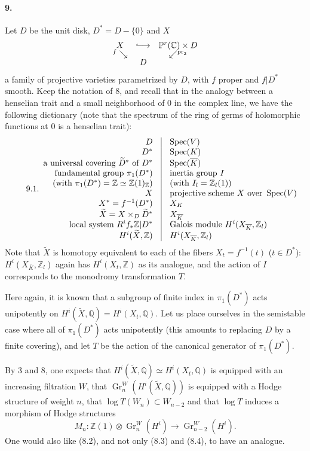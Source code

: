 \documentclass[10pt]{article}
\newcommand{\C}{\mathbb C}
\newcommand{\Q}{\mathbb Q}
\newcommand{\Z}{\mathbb Z}
\newcommand{\Gr}{\operatorname{Gr}}
\newcommand{\Spec}{\operatorname{Spec}}
\newcommand{\pr}{\operatorname{pr}}
\newcommand{\barK}{\overline{K}}
\newcommand{\wt}{\widetilde}
\begin{document}
\paragraph{9.} Let $D$ be the unit disk, $D^*=D-\{0\}$ and $X$
\[
\begin{array}{ccc}
X&\lhook\joinrel\longrightarrow&\mathbb P^r(\C)\times D\\[-0.2em]
{}^{f}\searrow&&\swarrow^{\pr_2}\\[-0.2em]
& D&
\end{array}
\]
a family of projective varieties parametrized by $D$, with $f$ proper and $f|D^*$ smooth. Keep the notation of 8, and recall that in the analogy between a henselian trait and a small neighborhood of $0$ in the complex line, we have the following dictionary (note that the spectrum of the ring of germs of holomorphic functions at $0$ is a henselian trait):
\[
\tag*{9.1.}
\begin{array}{r@{\quad\vrule\quad}l}
D & \Spec(V)\\
D^* & \Spec(K)\\
\text{a universal covering }\wt D^*\text{ of }D^* & \Spec(\barK)\\
\text{fundamental group }\pi_1(D^*) & \text{inertia group }I\\
\text{(with }\pi_1(D^*)=\Z\simeq\Z(1)_\Z\text{)} & \text{(with }I_l=\Z_l(1)\text{)}\\
X & \text{projective scheme }X\text{ over }\Spec(V)\\
X^*=f^{-1}(D^*) & X_K\\
\wt X=X\times_D\wt D^* & X_{\barK}\\
\text{local system }R^if_*\Z|D^* & \text{Galois module }H^i(X_{\barK},\Z_l)\\
H^i(\wt X,\Z) & H^i(X_{\barK},\Z_l) %
\end{array}
\]
Note that $\wt X$ is homotopy equivalent to each of the fibers $X_t=f^{-1}(t)$ ($t\in D^*$): $H^i(X_{\barK},\Z_l)$ again has $H^i(X_t,\Z)$ as its analogue, and the action of $I$ corresponds to the monodromy transformation $T$.

Here again, it is known that a subgroup of finite index in $\pi_1(D^*)$ acts unipotently on $H^i(\wt X,\Q)=H^i(X_t,\Q)$. Let us place ourselves in the semistable case where all of $\pi_1(D^*)$ acts unipotently (this amounts to replacing $D$ by a finite covering), and let $T$ be the action of the canonical generator of $\pi_1(D^*)$.

By 3 and 8, one expects that $H^i(\wt X,\Q)\simeq H^i(X_t,\Q)$ is equipped with an increasing filtration $W$, that $\Gr_n^W(H^i(\wt X,\Q))$ is equipped with a Hodge structure of weight $n$, that $\log T(W_n)\subset W_{n-2}$ and that $\log T$ induces a morphism of Hodge structures %
\[
M_n:\Z(1)\otimes\Gr_n^W(H^i)\longrightarrow\Gr_{n-2}^W(H^i). %
\]
One would also like (8.2), and not only (8.3) and (8.4), to have an analogue.
\end{document}

